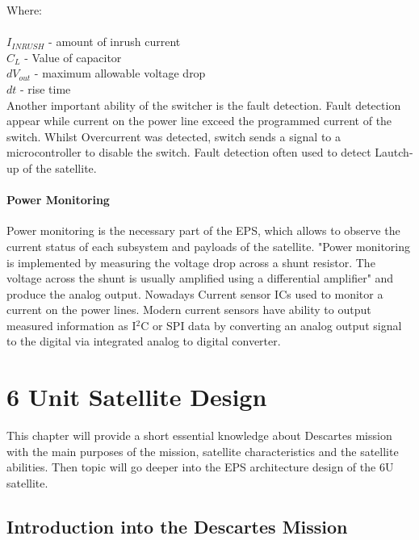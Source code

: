  Where:\\ \\
 $I_{INRUSH}$ - amount of inrush current\\
 $C_{L}$ - Value of capacitor \\
 $dV_{out}$ - maximum allowable voltage drop\\
 $dt$ - rise time\\

Another important ability of the switcher is the fault detection. Fault detection appear while current on the power line exceed the programmed current of the switch. Whilst Overcurrent was detected, switch sends a signal to a microcontroller to disable the switch. Fault detection often used to detect Lautch-up of the satellite.\\

\subsubsection{Power Monitoring}

Power monitoring is the necessary part of the EPS, which allows to observe the current status of each subsystem and payloads of the satellite. \cite{22} "Power monitoring is implemented by measuring the 
voltage drop across a shunt resistor.  The voltage across the shunt  is  usually  amplified  using  a  differential amplifier" and produce the analog output. Nowadays Current sensor ICs used to monitor a current on the power lines. Modern current sensors have ability to output measured information as I$^{2}$C or SPI data by converting an analog output signal to the digital via integrated analog to digital converter. 

\newpage   
\chapter{6 Unit Satellite Design \label{chapter3}}
This chapter will provide a short essential knowledge about Descartes mission with the main purposes of the mission, satellite characteristics and the satellite  abilities. Then topic will go deeper into the EPS architecture design of the 6U satellite. \\
\section{Introduction into the Descartes Mission}

